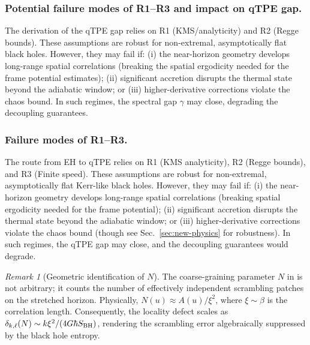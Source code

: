 \documentclass[aps,prd,preprint,onecolumn,superscriptaddress,nofootinbib,longbibliography,floatfix,11pt,showpacs,showkeys]{revtex4-2}
\theoremstyle{plain}
\theoremstyle{definition}
\theoremstyle{remark}
\newtheorem{remark}[theorem]{Remark}
\begin{document}
\subsubsection{Potential failure modes of R1--R3 and impact on qTPE gap.}
The derivation of the qTPE gap relies on R1 (KMS/analyticity) and R2 (Regge bounds). These assumptions are robust for non-extremal, asymptotically flat black holes. However, they may fail if: (i) the near-horizon geometry develops long-range spatial correlations (breaking the spatial ergodicity needed for the frame potential estimates); (ii) significant accretion disrupts the thermal state beyond the adiabatic window; or (iii) higher-derivative corrections violate the chaos bound. In such regimes, the spectral gap $\gamma$ may close, degrading the decoupling guarantees.

\subsubsection{Failure modes of R1--R3.}
The route from EH to qTPE relies on R1 (KMS analyticity), R2 (Regge bounds), and R3 (Finite speed).
These assumptions are robust for non-extremal, asymptotically flat Kerr-like black holes.
However, they may fail if: (i) the near-horizon geometry develops long-range spatial correlations (breaking spatial ergodicity needed for the frame potential); (ii) significant accretion disrupts the thermal state beyond the adiabatic window; or (iii) higher-derivative corrections violate the chaos bound (though see Sec.~\ref{sec:new-physics} for robustness).
In such regimes, the qTPE gap may close, and the decoupling guarantees would degrade.

\begin{remark}[Geometric identification of $N$]\label{rem:geometric-N}
The coarse-graining parameter $N$ in  is not arbitrary; it counts the number of effectively independent scrambling patches on the stretched horizon. Physically, $N(u) \approx A(u) / \xi^2$, where $\xi \sim \beta$ is the correlation length. Consequently, the locality defect scales as $\delta_{k,\ell}(N) \sim k \xi^2 / (4 G \hbar S_{\rm BH})$, rendering the scrambling error algebraically suppressed by the black hole entropy.
\end{remark}
\end{document}
